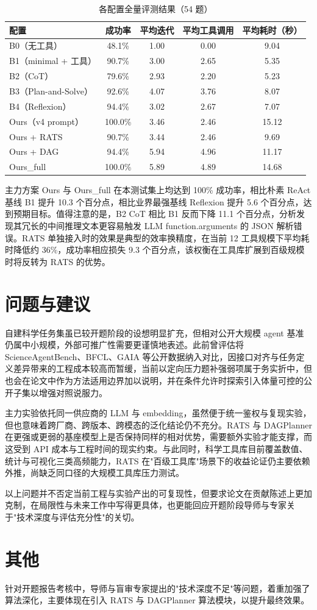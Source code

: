 \begin{table}[htbp]
    \centering
    \caption{各配置全量评测结果（54 题）}
    \label{tab:midcheck-results}
    \begin{tabular}{lcccc}
        \toprule
        配置 & 成功率 & 平均迭代 & 平均工具调用 & 平均耗时（秒） \\
        \midrule
        B0（无工具）         & 48.1\%  & 1.00 & 0.00 & 9.04  \\
        B1（minimal + 工具） & 90.7\%  & 3.00 & 2.65 & 5.35  \\
        B2（CoT）            & 79.6\%  & 2.93 & 2.20 & 5.23  \\
        B3（Plan-and-Solve） & 92.6\%  & 4.07 & 3.76 & 8.07  \\
        B4（Reflexion）      & 94.4\%  & 3.02 & 2.67 & 7.07  \\
        Ours（v4 prompt）    & 100.0\% & 3.46 & 2.46 & 15.12 \\
        Ours + RATS          & 90.7\%  & 3.44 & 2.46 & 9.69  \\
        Ours + DAG           & 94.4\%  & 5.94 & 4.96 & 11.17 \\
        Ours\_full           & 100.0\% & 5.89 & 4.89 & 14.68 \\
        \bottomrule
    \end{tabular}
\end{table}

主力方案 Ours 与 Ours\_full 在本测试集上均达到 100\% 成功率，相比朴素 ReAct 基线 B1 提升 10.3 个百分点，相比业界最强基线 Reflexion 提升 5.6 个百分点，达到预期目标。值得注意的是，B2 CoT 相比 B1 反而下降 11.1 个百分点，分析发现其冗长的中间推理文本更容易触发 LLM function.arguments 的 JSON 解析错误。RATS 单独接入时的效果是典型的效率换精度，在当前 12 工具规模下平均耗时降低约 36\%，成功率相应损失 9.3 个百分点，该权衡在工具库扩展到百级规模时将反转为 RATS 的优势。

\section{问题与建议}

自建科学任务集虽已较开题阶段的设想明显扩充，但相对公开大规模 agent 基准仍属中小规模，外部可推广性需要更谨慎地表述。此前曾评估将 ScienceAgentBench、BFCL、GAIA 等公开数据纳入对比，因接口对齐与任务定义差异带来的工程成本较高而暂缓，当前以定向压力题补强弱项属于务实折中，但也会在论文中作为方法适用边界加以说明，并在条件允许时探索引入体量可控的公开子集以增强对照说服力。

主力实验依托同一供应商的 LLM 与 embedding，虽然便于统一鉴权与复现实验，但也意味着跨厂商、跨版本、跨模态的泛化结论仍不充分。RATS 与 DAGPlanner 在更强或更弱的基座模型上是否保持同样的相对优势，需要额外实验才能支撑，而这受到 API 成本与工程时间的现实约束。与此同时，科学工具库目前覆盖数值、统计与可视化三类高频能力，RATS 在"百级工具库"场景下的收益论证仍主要依赖外推，尚缺乏同口径的大规模工具库压力测试。

以上问题并不否定当前工程与实验产出的可复现性，但要求论文在贡献陈述上更加克制，在局限性与未来工作中写得更具体，也更能回应开题阶段导师与专家关于"技术深度与评估充分性"的关切。

\section{其他}

针对开题报告考核中，导师与盲审专家提出的"技术深度不足"等问题，着重加强了算法深化，主要体现在引入 RATS 与 DAGPlanner 算法模块，以提升最终效果。
